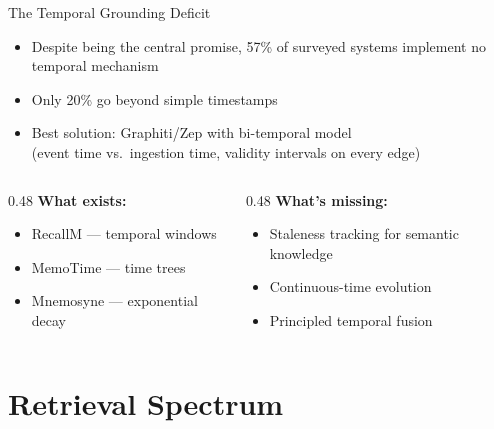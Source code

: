 \documentclass[aspectratio=169]{beamer}
\begin{document}
\begin{frame}{The Temporal Grounding Deficit}
  \begin{itemize}
    \item Despite being the central promise, \alert{57\%} of surveyed systems
      implement \alert{no temporal mechanism}
    \item Only 20\% go beyond simple timestamps
    \item Best solution: Graphiti/Zep with \alert{bi-temporal model}\\
      {\small (event time vs.\ ingestion time, validity intervals on every edge)}
  \end{itemize}

  \vspace{0.3cm}

  \begin{columns}[T]
    \begin{column}{0.48\textwidth}
      \textbf{What exists:}
      \begin{itemize}
        \item RecallM --- temporal windows
        \item MemoTime --- time trees
        \item Mnemosyne --- exponential decay
      \end{itemize}
    \end{column}
    \begin{column}{0.48\textwidth}
      \textbf{What's missing:}
      \begin{itemize}
        \item \alert{Staleness tracking} for semantic knowledge
        \item Continuous-time evolution
        \item Principled temporal fusion
      \end{itemize}
    \end{column}
  \end{columns}
\end{frame}

\section{Retrieval Spectrum}

\begin{frame}[plain]
  \sectionpage
\end{frame}
\end{document}
